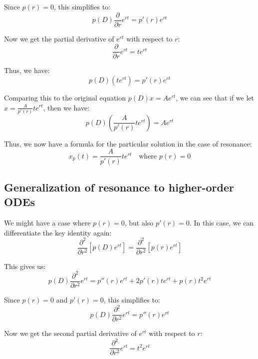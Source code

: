 Since $p(r) = 0$, this simplifies to:
\begin{equation*}
p(D) \frac{\partial}{\partial r} e^{rt} = p'(r) e^{rt}
\end{equation*}

Now we get the partial derivative of $e^{rt}$ with respect to $r$:
\begin{equation*}
\frac{\partial}{\partial r} e^{rt} = t e^{rt}
\end{equation*}

Thus, we have:
\begin{equation*}
p(D) (t e^{rt}) = p'(r) e^{rt}
\end{equation*}

Comparing this to the original equation $p(D) x = A e^{rt}$, we can see that if we let $x = \frac{A}{p'(r)} t e^{rt}$, then we have:
\begin{equation*}
p(D) \left( \frac{A}{p'(r)} t e^{rt} \right) = A e^{rt}
\end{equation*}

Thus, we now have a formula for the particular solution in the case of resonance:
\begin{equation*}
\boxed{
    x_p(t) = \frac{A}{p'(r)} t e^{rt} \quad \text{where } p(r) = 0
}
\end{equation*}

\subsection{Generalization of resonance to higher-order ODEs}

We might have a case where $p(r) = 0$, but also $p'(r) = 0$. In this case, we can differentiate the key identity again:
\begin{equation*}
\frac{\partial^2}{\partial r^2} \left[ p(D) e^{rt} \right] = \frac{\partial^2}{\partial r^2} \left[ p(r) e^{rt} \right]
\end{equation*}

This gives us:
\begin{equation*}
p(D) \frac{\partial^2}{\partial r^2} e^{rt} = p''(r) e^{rt} + 2 p'(r) t e^{rt} + p(r) t^2 e^{rt}
\end{equation*}

Since $p(r) = 0$ and $p'(r) = 0$, this simplifies to:
\begin{equation*}
p(D) \frac{\partial^2}{\partial r^2} e^{rt} = p''(r) e^{rt}
\end{equation*}

Now we get the second partial derivative of $e^{rt}$ with respect to $r$:
\begin{equation*}
\frac{\partial^2}{\partial r^2} e^{rt} = t^2 e^{rt}
\end{equation*}

